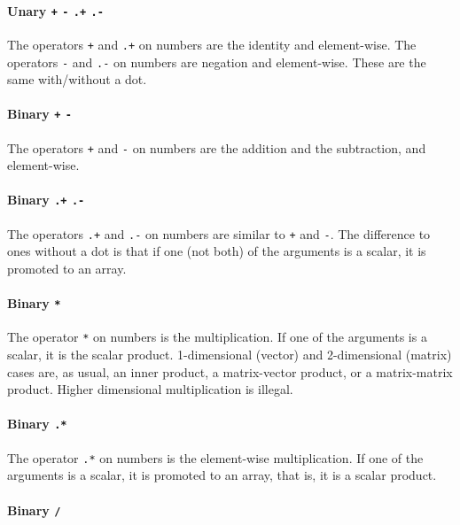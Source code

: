 \documentclass[10pt,b5paper]{article}
\begin{document}
\paragraph{Unary {\tt{}+} {\tt{}-} {\tt{}.+} {\tt{}.-}}

The operators \verb'+' and \verb'.+' on numbers are the identity and
element-wise.  The operators \verb'-' and \verb'.-' on numbers are
negation and element-wise.  These are the same with/without a dot.

\paragraph{Binary {\tt{}+} {\tt{}-}}

The operators \verb'+' and \verb'-' on numbers are the addition and
the subtraction, and element-wise.

\paragraph{Binary {\tt{}.+} {\tt{}.-}}

The operators \verb'.+' and \verb'.-' on numbers are similar to
\verb'+' and \verb'-'.  The difference to ones without a dot is that
if one (not both) of the arguments is a scalar, it is promoted to an
array.

\paragraph{Binary {\tt{}*}}

The operator \verb'*' on numbers is the multiplication.  If one of the
arguments is a scalar, it is the scalar product.  1-dimensional
(vector) and 2-dimensional (matrix) cases are, as usual, an inner
product, a matrix-vector product, or a matrix-matrix product.  Higher
dimensional multiplication is illegal.

\paragraph{Binary {\tt{}.*}}

The operator \verb'.*' on numbers is the element-wise multiplication.
If one of the arguments is a scalar, it is promoted to an array, that
is, it is a scalar product.

\paragraph{Binary {\tt{}/}}
\end{document}
